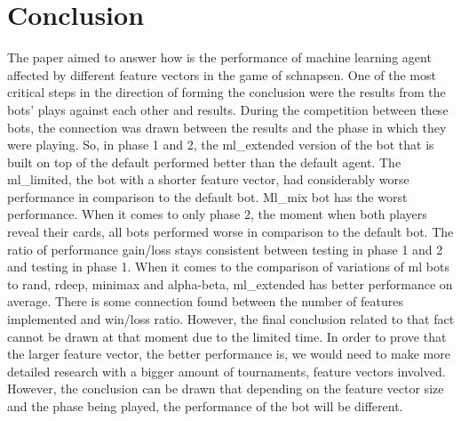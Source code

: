 \documentclass[master]{subfiles}
\begin{document}
\section{Conclusion}
The paper aimed to answer how is the performance of machine learning agent affected by different feature vectors in the game of schnapsen. One of the most critical steps in the direction of forming the conclusion were the results from the bots’ plays against each other and results. During the competition between these bots, the connection was drawn between the results and the phase in which they were playing. So, in phase 1 and 2, the ml\_extended version of the bot that is built on top of the default performed better than the default agent. The ml\_limited, the bot with a shorter feature vector, had considerably worse performance in comparison to the default bot. Ml\_mix bot has the worst performance. When it comes to only phase 2, the moment when both players reveal their cards, all bots performed worse in comparison to the default bot. The ratio of performance gain/loss stays consistent between testing in phase 1 and 2 and testing in phase 1. When it comes to the comparison of variations of ml bots to rand, rdeep, minimax and alpha-beta, ml\_extended has better performance on average. There is some connection found between the number of features implemented and win/loss ratio. However, the final conclusion related to that fact cannot be drawn at that moment due to the limited time. In order to prove that the larger feature vector, the better performance is, we would need to make more detailed research with a bigger amount of tournaments, feature vectors involved. However, the conclusion can be drawn that depending on the feature vector size and the phase being played, the performance of the bot will be different.
\end{document}
